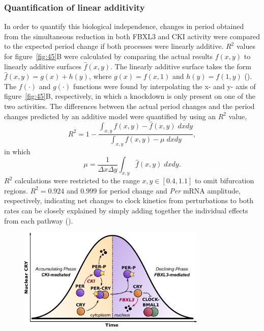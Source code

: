 \subsubsection{Quantification of linear additivity}

In order to quantify this biological independence, changes in period obtained from the simultaneous reduction in both FBXL3 and CKI activity were compared to the expected period change if both processes were linearly additive.
$R^2$ values for figure~\ref{fig:45}B were calculated by comparing the actual results $f(x,y)$ to linearly additive surfaces $\hat{f}(x,y)$.
The linearly additive surface takes the form $\hat{f}(x,y) = g(x) + h(y)$, where $g(x) = f(x,1)$ and $h(y) = f(1,y)$ (). 
The $f(\cdot)$ and $g(\cdot)$ functions were found by interpolating the x- and y- axis of figure~\ref{fig:45}B, respectively, in which a knockdown is only present on one of the two activities.
The differences between the actual period changes and the period changes predicted by an additive model were quantified by using an $R^2$ value,
\[
  R^2 = 1 - \frac{\int_{x,y} f(x,y) - \hat{f}(x,y)\; dxdy}{\int_{x,y} f(x,y) - \mu\; dxdy},
\]
in which
\[
  \mu = \frac{1}{\Delta x \Delta y}\int_{x,y} \hat{f}(x,y) \; dxdy.
\]
$R^2$ calculations were restricted to the range $x,y \in [0.4, 1.1]$ to omit bifurcation regions.
$R^2 = 0.924$ and $0.999$ for period change and {\itshape Per} mRNA amplitude, respectively, indicating net changes to clock kinetics from perturbations to both rates can be closely explained by simply adding together the individual effects from each pathway ().

\begin{figure}[h]
  \centering
  \includegraphics[width=0.8\textwidth]{chap4/figures/fig6.pdf}
  \label{fig:46}
\end{figure}

